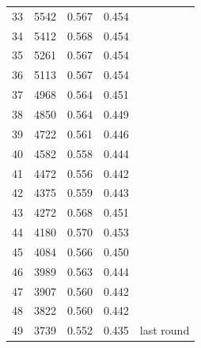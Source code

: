 \documentclass[11pt]{article}
\begin{document}
\begin{longtable}{rrrrl}
33 &  5542 & 0.567 & 0.454 & \\
34 &  5412 & 0.568 & 0.454 & \\
35 &  5261 & 0.567 & 0.454 & \\
36 &  5113 & 0.567 & 0.454 & \\
37 &  4968 & 0.564 & 0.451 & \\
38 &  4850 & 0.564 & 0.449 & \\
39 &  4722 & 0.561 & 0.446 & \\
40 &  4582 & 0.558 & 0.444 & \\
41 &  4472 & 0.556 & 0.442 & \\
42 &  4375 & 0.559 & 0.443 & \\
43 &  4272 & 0.568 & 0.451 & \\
44 &  4180 & 0.570 & 0.453 & \\
45 &  4084 & 0.566 & 0.450 & \\
46 &  3989 & 0.563 & 0.444 & \\
47 &  3907 & 0.560 & 0.442 & \\
48 &  3822 & 0.560 & 0.442 & \\
49 &  3739 & 0.552 & 0.435 & last round \\
\bottomrule
\end{longtable}
\end{document}

